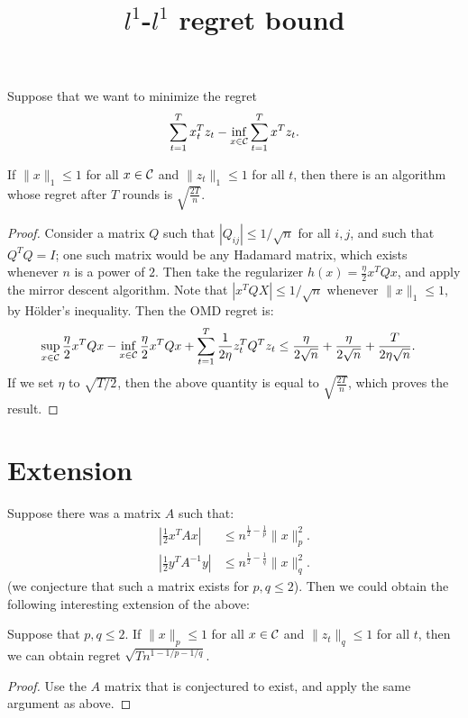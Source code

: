 \documentclass[11pt]{article}
\title{$l^1$-$l^1$ regret bound}
\begin{document}
\maketitle

Suppose that we want to minimize the regret 
\[ \sum_{t=1}^T x_t^Tz_t - \inf_{x \in \mathcal{C}} \sum_{t=1}^T x^Tz_t. \]
\begin{proposition}
If $\|x\|_1 \leq 1$ for all $x \in \mathcal{C}$ and 
$\|z_t\|_1 \leq 1$ for all $t$, then there is 
an algorithm whose regret 
after $T$ rounds is $\sqrt{\frac{2T}{n}}$.
\end{proposition}
\begin{proof}
Consider a matrix $Q$ such that $|Q_{ij}| \leq 1/\sqrt{n}$ 
for all $i,j$, and such that $Q^TQ = I$; one such matrix would 
be any Hadamard matrix, which exists whenever $n$ is a power of 
$2$. Then take the regularizer $h(x) = \frac{\eta}{2}x^TQx$, 
and apply the mirror descent algorithm. Note that 
$|x^TQX| \leq 1/\sqrt{n}$ whenever $\|x\|_1 \leq 1$, by H\"{o}lder's 
inequality. Then the OMD regret is:
\begin{align*}
\sup_{x \in \mathcal{C}} \frac{\eta}{2}x^TQx - \inf_{x \in \mathcal{C}} \frac{\eta}{2}x^TQx + \sum_{t=1}^T \frac{1}{2\eta} z_t^TQ^Tz_t &\leq \frac{\eta}{2\sqrt{n}} + \frac{\eta}{2\sqrt{n}} + \frac{T}{2\eta \sqrt{n}}.
\end{align*}
If we set $\eta$ to $\sqrt{T/2}$, then the above quantity is equal to 
$\sqrt{\frac{2T}{n}}$, which proves the result.
\end{proof}

\section{Extension}
Suppose there was a matrix $A$ such that:
\begin{align*}
\left|\frac{1}{2}x^TAx\right| &\leq n^{\frac{1}{2}-\frac{1}{p}} \|x\|_p^2. \\
\left|\frac{1}{2}y^TA^{-1}y\right| &\leq n^{\frac{1}{2}-\frac{1}{q}} \|x\|_q^2.
\end{align*}
(we conjecture that such a matrix exists for $p, q \leq 2$). Then we could 
obtain the following interesting extension of the above:
\begin{proposition}[Conjecture]
Suppose that $p, q \leq 2$. If $\|x\|_p \leq 1$ for all $x \in \mathcal{C}$ 
and $\|z_t\|_q \leq 1$ for all $t$, then we can obtain regret 
$\sqrt{Tn^{1-1/p-1/q}}$.
\end{proposition}
\begin{proof}
Use the $A$ matrix that is conjectured to exist, and apply the same argument as above.
\end{proof}
\end{document}
